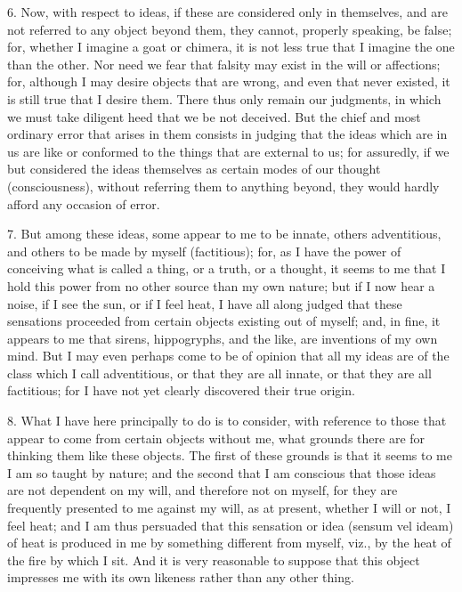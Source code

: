 6. Now, with respect to ideas, if these are considered only in themselves, and are not referred to any object beyond them, they cannot, properly speaking, be false; for, whether I imagine a goat or chimera, it is not less true that I imagine the one than the other. Nor need we fear that falsity may exist in the will or affections; for, although I may desire objects that are wrong, and even that never existed, it is still true that I desire them. There thus only remain our judgments, in which we must take diligent heed that we be not deceived. But the chief and most ordinary error that arises in them consists in judging that the ideas which are in us are like or conformed to the things that are external to us; for assuredly, if we but considered the ideas themselves as certain modes of our thought (consciousness), without referring them to anything beyond, they would hardly afford any occasion of error.

7. But among these ideas, some appear to me to be innate, others adventitious, and others to be made by myself (factitious); for, as I have the power of conceiving what is called a thing, or a truth, or a thought, it seems to me that I hold this power from no other source than my own nature; but if I now hear a noise, if I see the sun, or if I feel heat, I have all along judged that these sensations proceeded from certain objects existing out of myself; and, in fine, it appears to me that sirens, hippogryphs, and the like, are inventions of my own mind. But I may even perhaps come to be of opinion that all my ideas are of the class which I call adventitious, or that they are all innate, or that they are all factitious; for I have not yet clearly discovered their true origin.

8. What I have here principally to do is to consider, with reference to those that appear to come from certain objects without me, what grounds there are for thinking them like these objects. The first of these grounds is that it seems to me I am so taught by nature; and the second that I am conscious that those ideas are not dependent on my will, and therefore not on myself, for they are frequently presented to me against my will, as at present, whether I will or not, I feel heat; and I am thus persuaded that this sensation or idea (sensum vel ideam) of heat is produced in me by something different from myself, viz., by the heat of the fire by which I sit. And it is very reasonable to suppose that this object impresses me with its own likeness rather than any other thing.

